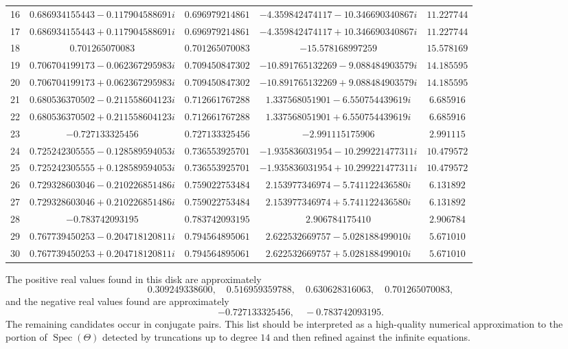 \documentclass[11pt,a4paper,reqno]{amsart}
\theoremstyle{remark}
\newcommand{\Spec}{\operatorname{Spec}}
\newcommand{\Th}{\Theta}
\begin{document}
{\begin{longtable}{rcccc}
16 & $0.686934155443-0.117904588691i$ & $0.696979214861$ & $-4.359842474117-10.346690340867i$ & $11.227744$ \\
17 & $0.686934155443+0.117904588691i$ & $0.696979214861$ & $-4.359842474117+10.346690340867i$ & $11.227744$ \\
18 & $0.701265070083$ & $0.701265070083$ & $-15.578168997259$ & $15.578169$ \\
19 & $0.706704199173-0.062367295983i$ & $0.709450847302$ & $-10.891765132269-9.088484903579i$ & $14.185595$ \\
20 & $0.706704199173+0.062367295983i$ & $0.709450847302$ & $-10.891765132269+9.088484903579i$ & $14.185595$ \\
21 & $0.680536370502-0.211558604123i$ & $0.712661767288$ & $1.337568051901-6.550754439619i$ & $6.685916$ \\
22 & $0.680536370502+0.211558604123i$ & $0.712661767288$ & $1.337568051901+6.550754439619i$ & $6.685916$ \\
23 & $-0.727133325456$ & $0.727133325456$ & $-2.991115175906$ & $2.991115$ \\
24 & $0.725242305555-0.128589594053i$ & $0.736553925701$ & $-1.935836031954-10.299221477311i$ & $10.479572$ \\
25 & $0.725242305555+0.128589594053i$ & $0.736553925701$ & $-1.935836031954+10.299221477311i$ & $10.479572$ \\
26 & $0.729328603046-0.210226851486i$ & $0.759022753484$ & $2.153977346974-5.741122436580i$ & $6.131892$ \\
27 & $0.729328603046+0.210226851486i$ & $0.759022753484$ & $2.153977346974+5.741122436580i$ & $6.131892$ \\
28 & $-0.783742093195$ & $0.783742093195$ & $2.906784175410$ & $2.906784$ \\
29 & $0.767739450253-0.204718120811i$ & $0.794564895061$ & $2.622532669757-5.028188499010i$ & $5.671010$ \\
30 & $0.767739450253+0.204718120811i$ & $0.794564895061$ & $2.622532669757+5.028188499010i$ & $5.671010$ \\
\bottomrule
\end{longtable}
}

The positive real values found in this disk are approximately
\[
  0.309249338600,
  \quad
  0.516959359788,
  \quad
  0.630628316063,
  \quad
  0.701265070083,
\]
and the negative real values found are approximately
\[
  -0.727133325456,
  \quad
  -0.783742093195.
\]
The remaining candidates occur in conjugate pairs.  This list should be interpreted as a high-quality numerical approximation to the portion of $\Spec(\Th)$ detected by truncations up to degree $14$ and then refined against the infinite equations.
\end{document}

